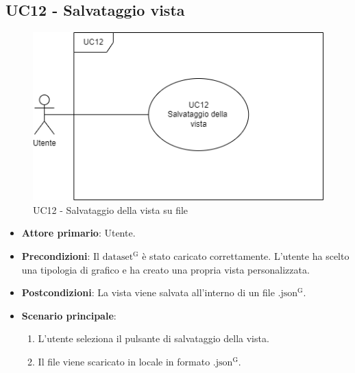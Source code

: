 \subsection{UC12 - Salvataggio vista}
\label{sec:UC12}
\begin{figure}[h!]
    \centering
    \includegraphics[scale=0.60]{../../assets/salvataggio_vista.png}
    \caption{UC12 - Salvataggio della vista su file}
\end{figure}
\begin{itemize}
    \item \textbf{Attore primario}: Utente.
    \item \textbf{Precondizioni}: Il ${\mathrm{dataset^{G}}}$ è stato caricato correttamente. L'utente ha scelto una tipologia di grafico e ha creato una propria vista personalizzata.
    \item \textbf{Postcondizioni}: La vista viene salvata all'interno di un file ${\mathrm{.json^{G}}}$.
    \item \textbf{Scenario principale}:
          \begin{enumerate}
              \item L'utente seleziona il pulsante di salvataggio della vista.
              \item Il file viene scaricato in locale in formato ${\mathrm{.json^{G}}}$.
          \end{enumerate}
\end{itemize}

\newpage


